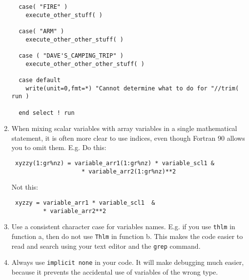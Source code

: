 \documentclass[letterpaper,12pt]{article}
\begin{document}
\begin{enumerate}
\begin{verbatim}
  case( "FIRE" )
    execute_other_stuff( )

  case( "ARM" )
    execute_other_other_stuff( )
 
  case ( "DAVE'S_CAMPING_TRIP" ) 
    execute_other_other_other_stuff( ) 

  case default
    write(unit=0,fmt=*) "Cannot determine what to do for "//trim( run )

  end select ! run

\end{verbatim}

\item When mixing scalar variables with array variables in a single
mathematical statement, it is often more clear to use indices, even
though Fortran 90 allows you to omit them. \newline
E.g. Do this:

\begin{verbatim}
 xyzzy(1:gr%nz) = variable_arr1(1:gr%nz) * variable_scl1 &
                    * variable_arr2(1:gr%nz)**2
\end{verbatim}

Not this:
\begin{verbatim}
 xyzzy = variable_arr1 * variable_scl1  &
         * variable_arr2**2
\end{verbatim}

\item Use a consistent character case for variables names. 
E.g. if you use \texttt{thlm} in function a, then do not use \texttt{Thlm} in function b. 
This makes the code easier to read and search using your text editor and the 
\texttt{grep} command.
\newline

\item Always use \texttt{implicit none} in your code.  It will make 
debugging much easier, because it prevents the accidental use of 
variables of the wrong type.
\newline


\end{enumerate}
\end{document}

